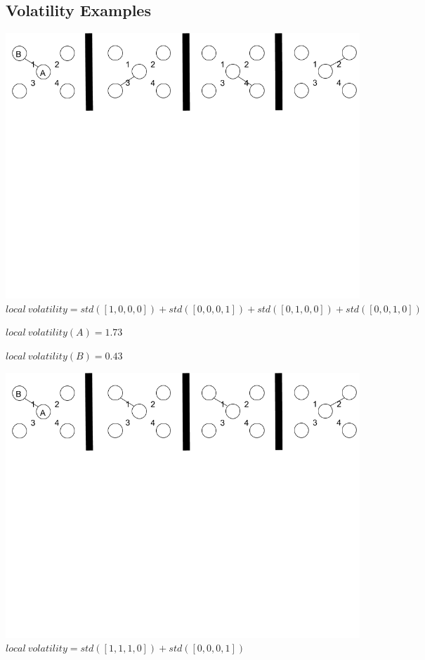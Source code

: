 \documentclass[oneside,12pt]{Classes/RoboticsLaTeX}
\begin{document}
\appendix
%
%

\renewcommand{\bibname}{References}           %
\nocite{*}
\begin{appendices}
\chapter{Volatility Examples}
\label{appendix:appendixA}
\begin{center}
\includegraphics[trim={0 15cm 0 0}, width=140mm]{./Figures/volatilityAppendix1.png}
$local\ volatility = std([1,0,0,0]) + std([0,0,0,1]) + std([0,1,0,0]) + std([0,0,1,0])$

$local\ volatility(A) = 1.73$

$local\ volatility(B) = 0.43$
\end{center}
\begin{center}
\includegraphics[trim={0 15cm 0 0}, width=140mm]{./Figures/volatilityAppendix2.png}
$local\ volatility = std([1,1,1,0]) + std([0,0,0,1])$


\end{center}
\end{appendices}
\end{document}
